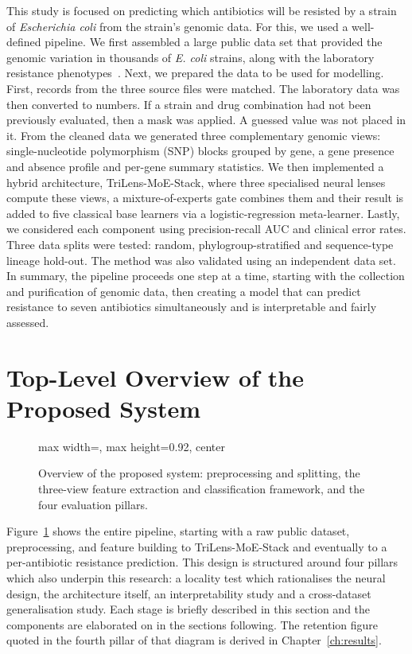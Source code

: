 This study is focused on predicting which antibiotics will be resisted by a strain of \textit{Escherichia coli} from the strain's genomic data. For this, we used a well-defined pipeline. We first assembled a large public data set that provided the genomic variation in thousands of \textit{E. coli} strains, along with the laboratory resistance phenotypes~\cite{arcadia2024}. Next, we prepared the data to be used for modelling. First, records from the three source files were matched. The laboratory data was then converted to numbers. If a strain and drug combination had not been previously evaluated, then a mask was applied. A guessed value was not placed in it. From the cleaned data we generated three complementary genomic views: single-nucleotide polymorphism (SNP) blocks grouped by gene, a gene presence and absence profile and per-gene summary statistics. We then implemented a hybrid architecture, TriLens-MoE-Stack, where three specialised neural lenses compute these views, a mixture-of-experts gate combines them and their result is added to five classical base learners via a logistic-regression meta-learner. Lastly, we considered each component using precision-recall AUC and clinical error rates. Three data splits were tested: random, phylogroup-stratified and sequence-type lineage hold-out. The method was also validated using an independent data set. In summary, the pipeline proceeds one step at a time, starting with the collection and purification of genomic data, then creating a model that can predict resistance to seven antibiotics simultaneously and is interpretable and fairly assessed.

\section{Top-Level Overview of the Proposed System}

\begin{figure}[H]
  \centering
  \begin{adjustbox}{max width=\textwidth, max height=0.92\textheight, center}
  
  \end{adjustbox}
  \vspace{-1.5cm}
  \caption{Overview of the proposed system: preprocessing and splitting, the three-view feature extraction and classification framework, and the four evaluation pillars.}
  \label{fig:overview}
\end{figure}

Figure~\ref{fig:overview} shows the entire pipeline, starting with a raw public dataset, preprocessing, and feature building to TriLens-MoE-Stack and eventually to a per-antibiotic resistance prediction. This design is structured around four pillars which also underpin this research: a locality test which rationalises the neural design, the architecture itself, an interpretability study and a cross-dataset generalisation study. Each stage is briefly described in this section and the components are elaborated on in the sections following. The retention figure quoted in the fourth pillar of that diagram is derived in Chapter~\ref{ch:results}.


